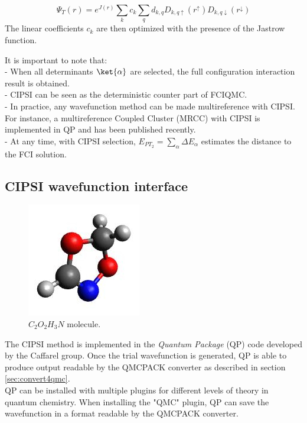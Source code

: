 \begin{equation}
\Psi_T(r)=e^{J(r)}\sum_k c_k \sum_q d_{k,q}D_{k,q\uparrow } (r^{\uparrow})D_{k,q\downarrow}(r^{\downarrow})
\end{equation}
The linear coefficients $c_k$ are then optimized with the presence of the Jastrow function. 

It is important to note that:\\
- When all determinants $\ket{\alpha}$ are selected, the full configuration interaction result is obtained.\\
- CIPSI can be seen as the deterministic counter part of FCIQMC. \\
- In practice, any wavefunction method can be made multireference with CIPSI. For instance, a multireference Coupled Cluster (MRCC) with CIPSI is implemented in QP and has been published recently.\cite{Garniron2017-1}\\
- At any time, with CIPSI selection, $E_{PT_2}=\sum_\alpha \Delta E_\alpha$ estimates the distance to the FCI solution.



\subsection{CIPSI wavefunction interface}
\label{sec:cipsi}


\begin{figure}
\begin{center}
\includegraphics[trim = 0mm 0mm 0mm 0mm, clip,width=0.3\columnwidth]{figures/Reactant.jpg}
\end{center}
\caption{$C_2O_2H_3N$ molecule.
\label{fig:C2O2H3N}
}
\end{figure}
The CIPSI method
is implemented in the \textit{Quantum Package} (QP) code\cite{QP} developed by the Caffarel group. Once the trial wavefunction is generated, QP is able to produce output readable by the QMCPACK converter as described in section \ref{sec:convert4qmc}.\\
QP can be installed with multiple plugins for different levels of theory in quantum chemistry. When installing the "QMC" plugin, QP can save the wavefunction in a format readable by the QMCPACK converter. \\

